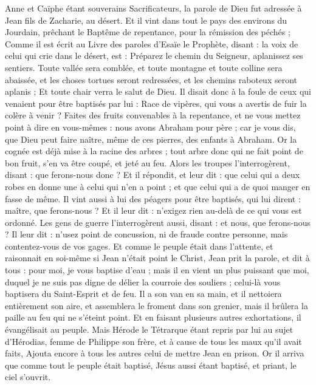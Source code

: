 \begin{multicols}{2}
Anne et Caïphe étant souverains Sacrificateurs, la parole de Dieu fut adressée à Jean fils de Zacharie, au désert.
Et il vint dans tout le pays des environs du Jourdain, prêchant le Baptême de repentance, pour la rémission des péchés ;
Comme il est écrit au Livre des paroles d'Esaïe le Prophète, disant : la voix de celui qui crie dans le désert, est : Préparez le chemin du Seigneur, aplanissez ses sentiers.
Toute vallée sera comblée, et toute montagne et toute colline sera abaissée, et les choses tortues seront redressées, et les chemins raboteux seront aplanis ;
Et toute chair verra le salut de Dieu.
Il disait donc à la foule de ceux qui venaient pour être baptisés par lui : Race de vipères, qui vous a avertis de fuir la colère à venir ?
Faites des fruits convenables à la repentance, et ne vous mettez point à dire en vous-mêmes : nous avons Abraham pour père ; car je vous dis, que Dieu peut faire naître, même de ces pierres, des enfants à Abraham.
Or la cognée est déjà mise à la racine des arbres ; tout arbre donc qui ne fait point de bon fruit, s'en va être coupé, et jeté au feu.
Alors les troupes l'interrogèrent, disant : que ferons-nous donc ?
Et il répondit, et leur dit : que celui qui a deux robes en donne une à celui qui n'en a point ; et que celui qui a de quoi manger en fasse de même.
Il vint aussi à lui des péagers pour être baptisés, qui lui dirent : maître, que ferons-nous ?
Et il leur dit : n'exigez rien au-delà de ce qui vous est ordonné.
Les gens de guerre l'interrogèrent aussi, disant : et nous, que ferons-nous ? Il leur dit : n'usez point de concussion, ni de fraude contre personne, mais contentez-vous de vos gages.
Et comme le peuple était dans l'attente, et raisonnait en soi-même si Jean n'était point le Christ,
Jean prit la parole, et dit à tous : pour moi, je vous baptise d'eau ; mais il en vient un plus puissant que moi, duquel je ne suis pas digne de délier la courroie des souliers ; celui-là vous baptisera du Saint-Esprit et de feu.
Il a son van en sa main, et il nettoiera entièrement son aire, et assemblera le froment dans son grenier, mais il brûlera la paille au feu qui ne s'éteint point.
Et en faisant plusieurs autres exhortations, il évangélisait au peuple.
Mais Hérode le Tétrarque étant repris par lui au sujet d'Hérodias, femme de Philippe son frère, et à cause de tous les maux qu'il avait faits,
Ajouta encore à tous les autres celui de mettre Jean en prison.
Or il arriva que comme tout le peuple était baptisé, Jésus aussi étant baptisé, et priant, le ciel s'ouvrit.

\end{multicols}
